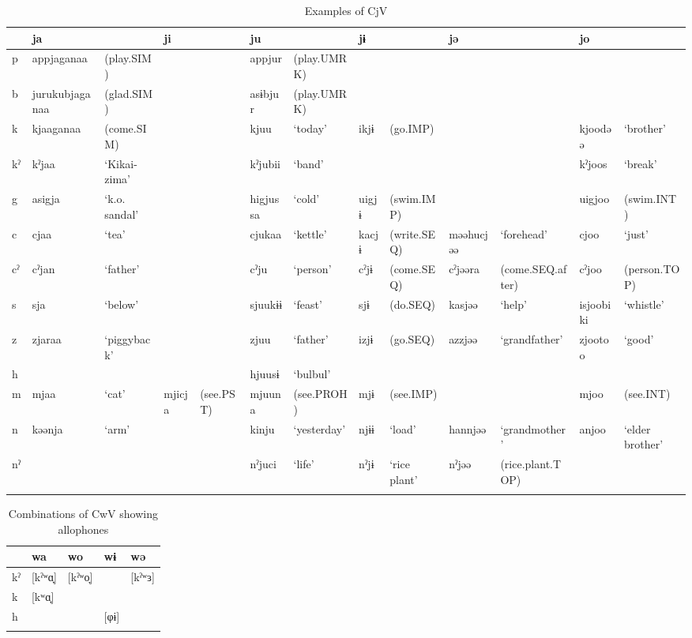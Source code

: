\begin{sidewaystable}
\caption{Examples of CjV}
\footnotesize
\begin{tabular}{@{}l @{\hspace{.5em}}  *{5}{l@{ }l@{\hspace{.5em}}} l@{ } l@{}} 
\lsptoprule
 & ja &  & ji &  & ju &  & jɨ &  & jə &  & jo & \\\midrule
p & appjaganaa & (play.SIM) &  &  & appjur & (play.UMRK) &  &  &  &  &  & \\
b & jurukubjaganaa & (glad.SIM) & & &  asɨbjur & (play.UMRK) &  &  &  &  &  & \\
k & kjaaganaa & (come.SIM) &  &  & kjuu & ‘today’ & ikjɨ & (go.IMP) &  &  & kjoodəə & ‘brother’\\
kˀ & kˀjaa & ‘Kikai-zima’ &  &  & kˀjubii & ‘band’ &  &  &  &  & kˀjoos & ‘break’\\
g & asigja & ‘k.o. sandal’ &  &  & higjussa & ‘cold’ & uigjɨ & (swim.IMP) &  &  & uigjoo & (swim.INT)\\
c & cjaa & ‘tea’ &  &  & cjukaa & ‘kettle’ & kacjɨ & (write.SEQ) & məəhucjəə & ‘forehead’ & cjoo & ‘just’\\
cˀ & cˀjan & ‘father’ &  &  & cˀju & ‘person’ & cˀjɨ & (come.SEQ) & cˀjəəra & (come.SEQ.after) & cˀjoo & (person.TOP)\\
s & sja & ‘below’ &  &  & sjuukɨɨ & ‘feast’ & sjɨ & (do.SEQ) & kasjəə & ‘help’ & isjoobiki & ‘whistle’\\
z & zjaraa & ‘piggyback’ &  &  & zjuu & ‘father’ & izjɨ & (go.SEQ) & azzjəə & ‘grandfather’ & zjootoo & ‘good’\\
h &  &  &  &  & hjuusɨ & ‘bulbul’ &  &  &  &  &  & \\
m & mjaa & ‘cat’ & mjicja & (see.PST)  & mjuuna & (see.PROH) & mjɨ & (see.IMP) &  &  & mjoo & (see.INT)\\
n & kəənja & ‘arm’ &  &  & kinju & ‘yesterday’ & njɨɨ & ‘load’ & hannjəə & ‘grandmother’ & anjoo & ‘elder brother’\\
nˀ &  &  &  &  & nˀjuci & ‘life’ & nˀjɨ & ‘rice plant’ & nˀjəə & (rice.plant.TOP) &  & \\
\lspbottomrule
\end{tabular}
\end{sidewaystable}


\begin{table}
\caption{Combinations of CwV showing allophones\label{bkm:Ref365009143}}
\begin{tabularx}{\textwidth}{lQQQQ}
\lsptoprule
   & wa &  wo &  wɨ & wə\\\midrule
kˀ &  [kˀʷɑ̟] & [kˀʷo̞]   & & [kˀʷɜ]\\
k  &  [kʷɑ̟]      \\
h  &          &      & [φɨ]  \\
\lspbottomrule
\end{tabularx}
\end{table}


